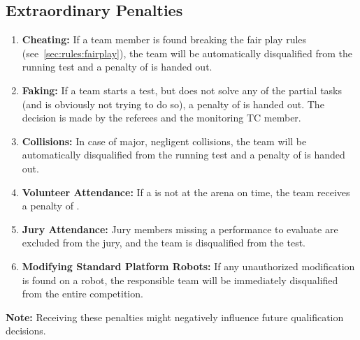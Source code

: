 \subsection{Extraordinary Penalties}
\label{sec:rules:extrapenalties}
\begin{enumerate}
	\item \textbf{Cheating:} If a team member is found breaking the fair play rules (see~\ref{sec:rules:fairplay}), the team will be automatically disqualified from the running test and a penalty of  is handed out.

	\item \textbf{Faking:} If a team starts a test, but does not solve any of the partial tasks (and is obviously not trying to do so), a penalty of  is handed out.
	The decision is made by the referees and the monitoring TC member.

	\item \textbf{Collisions:} In case of major, negligent collisions, the team will be automatically disqualified from the running test and a penalty of  is handed out.

	\item \textbf{Volunteer Attendance:} If a \Volunteer{} is not at the arena on time, the team receives a penalty of .

	\item \textbf{Jury Attendance:} Jury members missing a performance to evaluate are excluded from the jury, and the team is disqualified from the test.

	\item \textbf{Modifying Standard Platform Robots:} If any unauthorized modification is found on a \SPL{} robot, the responsible team will be immediately disqualified from the entire competition.
\end{enumerate}
\noindent\textbf{Note:} Receiving these penalties might negatively influence future qualification decisions.


